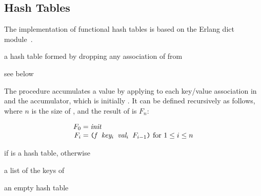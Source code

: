 \subsection{Hash Tables}

The implementation of functional hash tables is based on the Erlang
dict module~\cite{dict-ref,dynamic-hashing}.

\begin{procedure}
\end{procedure}
\returns{} a hash table formed by dropping any association of
 from 

\begin{procedure}
\end{procedure}
\returns{} see below

The  procedure accumulates a value by applying 
to each key/value association in  and the accumulator, which
is initially . It can be defined recursively as follows,
where $n$ is the size of , and the result of 
is $F_n$:

$$\begin{array}{r@{\;=\;}l}
F_0 & \var{init}\\
F_i & \code{(\var{f} \var{key$_i$} \var{val$_i$} $F_{i-1}$)}
\hbox{ for $1 \le i \le n$}\\
\end{array}$$

\begin{procedure}
\end{procedure}
\returns{}  if  is a hash table, 
otherwise

\begin{procedure}
\end{procedure}
\returns{} a list of the keys of 

\begin{procedure}
\end{procedure}
\returns{} an empty hash table

